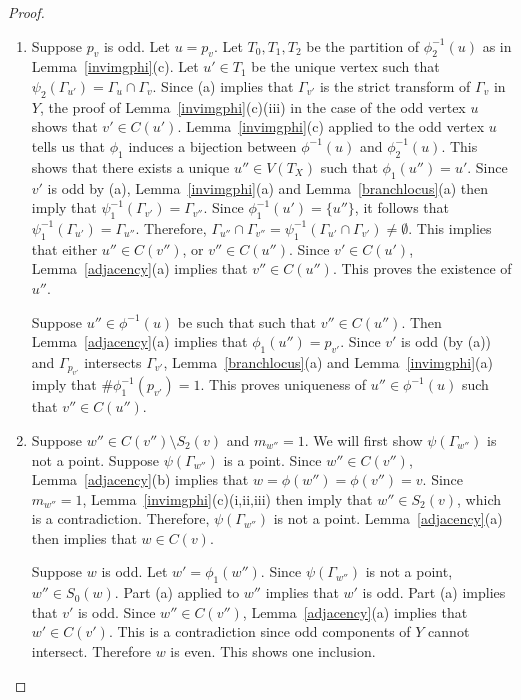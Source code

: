 \begin{proof}
\begin{enumerate}[\upshape (a)]
  \item Suppose $p_v$ is odd. Let $u = p_v$. Let $T_0,T_1,T_2$ be the partition of $\phi_2^{-1}(u)$ as in Lemma~\ref{invimgphi}(c). Let $u' \in T_1$ be the unique vertex such that $\psi_2(\Gamma_{u'}) = \Gamma_u \cap \Gamma_v$. Since (a) implies that $\Gamma_{v'}$ is the strict transform of $\Gamma_v$ in $Y$, the proof of Lemma~\ref{invimgphi}(c)(iii) in the case of the odd vertex $u$ shows that $v' \in C(u')$. Lemma~\ref{invimgphi}(c) applied to the odd vertex $u$ tells us that $\phi_1$ induces a bijection between $\phi^{-1}(u)$ and $\phi_2^{-1}(u)$. This shows that there exists a unique $u'' \in V(T_X)$ such that $\phi_1(u'') = u'$. Since $v'$ is odd by (a), Lemma~\ref{invimgphi}(a) and Lemma~\ref{branchlocus}(a) then imply that $\psi_1^{-1}(\Gamma_{v'}) = \Gamma_{v''}$. Since $\phi_1^{-1}(u') = \{ u'' \}$, it follows that $\psi_1^{-1}(\Gamma_{u'}) = \Gamma_{u''}$. Therefore, $\Gamma_{u''} \cap \Gamma_{v''} = \psi_1^{-1}(\Gamma_{u'} \cap \Gamma_{v'}) \neq \emptyset$. This implies that either $u'' \in C(v'')$, or $v'' \in C(u'')$. Since $v' \in C(u')$, Lemma~\ref{adjacency}(a) implies that $v'' \in C(u'')$. This proves the existence of $u''$.
  
  Suppose $u'' \in \phi^{-1}(u)$ be such that such that $v'' \in C(u'')$. Then Lemma~\ref{adjacency}(a) implies that $\phi_1(u'') = p_{v'}$. Since $v'$ is odd (by (a)) and $\Gamma_{p_{v'}}$ intersects $\Gamma_{v'}$, Lemma~\ref{branchlocus}(a) and Lemma~\ref{invimgphi}(a) imply that $\# \phi_1^{-1}(p_{v'}) = 1$. This proves uniqueness of $u'' \in \phi^{-1}(u)$ such that $v'' \in C(u'')$.
  
  \item Suppose $w'' \in C(v'') \setminus S_2(v)$ and $m_{w''} = 1$. We will first show $\psi(\Gamma_{w''})$ is not a point. Suppose $\psi(\Gamma_{w''})$ is a point. Since $w'' \in C(v'')$, Lemma~\ref{adjacency}(b) implies that $w = \phi(w'') = \phi(v'') = v$. Since $m_{w''} = 1$, Lemma~\ref{invimgphi}(c)(i,ii,iii) then imply that $w'' \in S_2(v)$, which is a contradiction. Therefore, $\psi(\Gamma_{w''})$ is not a point. Lemma~\ref{adjacency}(a) then implies that $w \in C(v)$.
  
  Suppose $w$ is odd. Let $w' = \phi_1(w'')$. Since $\psi(\Gamma_{w''})$ is not a point,  $w'' \in S_0(w)$. Part (a) applied to $w''$ implies that $w'$ is odd. Part (a) implies that $v'$ is odd.  Since $w'' \in C(v'')$, Lemma~\ref{adjacency}(a) implies that $w' \in C(v')$. This is a contradiction since odd components of $Y$ cannot intersect. Therefore $w$ is even. This shows one inclusion.
    

\end{enumerate}
\end{proof}
